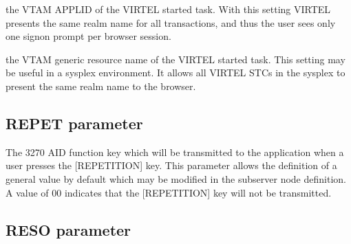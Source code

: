 \documentclass[letterpaper,10pt,english]{sphinxmanual}
\begin{document}
\sphinxAtStartPar
{} \sphinxhyphen{} the VTAM APPLID of the VIRTEL started task. With this setting VIRTEL presents the same realm name for all transactions, and thus the user sees only one signon prompt per browser session.

\sphinxAtStartPar
{} \sphinxhyphen{} the VTAM generic resource name of the VIRTEL started task. This setting may be useful in a sysplex environment. It allows all VIRTEL STCs in the sysplex to present the same realm name to the browser.

\ignorespaces 

\subsection{REPET parameter}
\label{\detokenize{Installation_Guide:repet-parameter}}\label{\detokenize{Installation_Guide:index-108}}
\begin{sphinxVerbatim}[commandchars=\\\{\}]
  
\end{sphinxVerbatim}

\sphinxAtStartPar
{} \sphinxhyphen{} The 3270 AID function key which will be transmitted to the application when a user presses the {[}REPETITION{]} key. This parameter allows the definition of a general value by default which may be modified in the sub\sphinxhyphen{}server node definition. A value of 00 indicates that the {[}REPETITION{]} key will not be transmitted.

\ignorespaces 

\subsection{RESO parameter}
\label{\detokenize{Installation_Guide:reso-parameter}}\label{\detokenize{Installation_Guide:index-109}}
\begin{sphinxVerbatim}[commandchars=\\\{\}]
 
\end{sphinxVerbatim}
\end{document}
